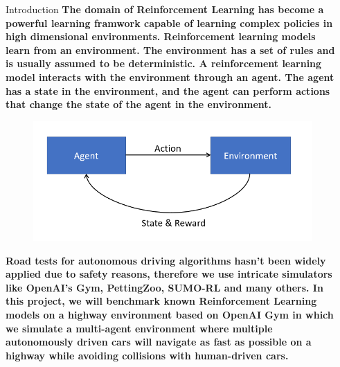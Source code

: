\documentclass[final]{beamer}
\newlength{\sepmargin}
\newlength{\onecolwid}
\begin{document}
  \setlength{\belowcaptionskip}{2ex} %
  \setlength\belowdisplayshortskip{1ex} %
  

\begin{frame}[t] 
\begin{columns}[t] 
\begin{column}{\sepmargin}\end{column}
\begin{column}{\onecolwid} %
\vspace{1em}
  \begin{block}{Introduction}
\textbf{The domain of Reinforcement Learning has become a powerful learning framwork capable of learning
    complex policies in high dimensional environments. 
    Reinforcement learning models learn from an environment. The environment has a set of rules and is usually assumed to be deterministic. A reinforcement learning model interacts with the environment through an agent. The agent has a state in the environment, and the agent can perform actions that change the state of the agent in the environment.
\\}
\begin{figure}
    \vspace*{0.2cm}
    \includegraphics[width=0.6\linewidth]{images/rl_diag.png}
    \end{figure}

\textbf{Road tests for autonomous driving algorithms hasn't been widely applied due to safety reasons, therefore we use
    intricate simulators like OpenAI's Gym, PettingZoo, SUMO-RL and many others. In this project, we will benchmark known Reinforcement Learning
    models on a highway environment based on OpenAI Gym in which we simulate a multi-agent environment where multiple autonomously driven cars will navigate as fast as possible
    on a highway while avoiding collisions with human-driven cars.}


\end{block}
\end{column}
\end{columns}
\end{frame}
\end{document}
